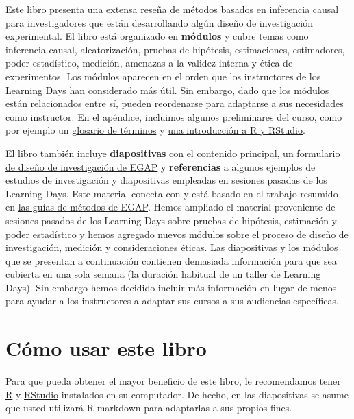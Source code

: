 \documentclass[12pt,spanish,]{book}
\begin{document}
Este libro presenta una extensa reseña de métodos basados en inferencia causal para investigadores que están desarrollando algún diseño de investigación experimental. El libro está organizado en \textbf{módulos} y cubre temas como inferencia causal, aleatorización, pruebas de hipótesis, estimaciones, estimadores, poder estadístico, medición, amenazas a la validez interna y ética de experimentos. Los módulos aparecen en el orden que los instructores de los Learning Days han considerado más útil. Sin embargo, dado que los módulos están relacionados entre sí, pueden reordenarse para adaptarse a sus necesidades como instructor. En el apéndice, incluimos algunos preliminares del curso, como por ejemplo un \href{glosario-de-términos.html}{glosario de términos} y \href{introducción-a-r-y-rstudio.html}{una introducción a R y RStudio}.

El libro también incluye \textbf{diapositivas} con el contenido principal, un \href{researchdesignform.html}{formulario de diseño de investigación de EGAP} y \textbf{referencias} a algunos ejemplos de estudios de investigación y diapositivas empleadas en sesiones pasadas de los Learning Days. Este material conecta con y está basado en el trabajo resumido en \href{https://egap.org/methods-guides/}{las guías de métodos de EGAP}. Hemos ampliado el material proveniente de sesiones pasados de los Learning Days sobre pruebas de hipótesis, estimación y poder estadístico y hemos agregado nuevos módulos sobre el proceso de diseño de investigación, medición y consideraciones éticas. Las diapositivas y los módulos que se presentan a continuación contienen demasiada información para que sea cubierta en una sola semana (la duración habitual de un taller de Learning Days). Sin embargo hemos decidido incluir más información en lugar de menos para ayudar a los instructores a adaptar sus cursos a sus audiencias específicas.

\hypertarget{cuxf3mo-usar-este-libro}{%
\section{Cómo usar este libro}\label{cuxf3mo-usar-este-libro}}

Para que pueda obtener el mayor beneficio de este libro, le recomendamos tener \href{https://cran.r-project.org/}{R} y \href{https://www.rstudio.com/products/rstudio/download/}{RStudio} instalados en su computador. De hecho, en las diapositivas se asume que usted utilizará R markdown para adaptarlas a sus propios fines.
\end{document}
